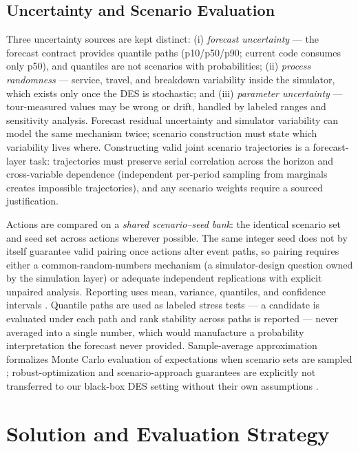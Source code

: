 \documentclass[11pt,a4paper]{article}
\begin{document}
\subsection{Uncertainty and Scenario Evaluation}\label{sec:uncertainty}

Three uncertainty sources are kept distinct: (i) \emph{forecast uncertainty}
--- the forecast contract provides quantile paths (p10/p50/p90; current code
consumes only p50), and quantiles are not scenarios with probabilities;
(ii) \emph{process randomness} --- service, travel, and breakdown variability
inside the simulator, which exists only once the DES is stochastic; and
(iii) \emph{parameter uncertainty} --- tour-measured values may be wrong or
drift, handled by labeled ranges and sensitivity analysis. Forecast residual
uncertainty and simulator variability can model the same mechanism twice;
scenario construction must state which variability lives where. Constructing
valid joint scenario trajectories is a forecast-layer task: trajectories must
preserve serial correlation across the horizon and cross-variable dependence
(independent per-period sampling from marginals creates impossible
trajectories), and any scenario weights require a sourced justification.

Actions are compared on a \emph{shared scenario--seed bank}: the identical
scenario set and seed set across actions wherever possible. The same integer
seed does not by itself guarantee valid pairing once actions alter event
paths, so pairing requires either a common-random-numbers mechanism (a
simulator-design question owned by the simulation layer) or adequate
independent replications with explicit unpaired analysis. Reporting uses
mean, variance, quantiles, and confidence intervals \cite{alexopoulos2006output}.
Quantile paths are used as labeled stress tests --- a candidate is evaluated
under each path and rank stability across paths is reported --- never
averaged into a single number, which would manufacture a probability
interpretation the forecast never provided. Sample-average approximation
formalizes Monte Carlo evaluation of expectations when scenario sets are
sampled \cite{amaran2016simulation,kleywegt2002saa}; robust-optimization and
scenario-approach guarantees are explicitly not transferred to our black-box
DES setting without their own assumptions
\cite{bertsimas2004price,campi2008scenario}.

\section{Solution and Evaluation Strategy}\label{sec:strategy}
\end{document}
